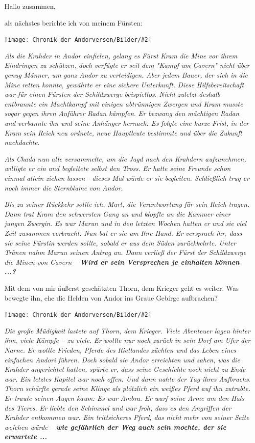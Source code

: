 \documentclass[10pt, a4paper, oneside]{book}
\newcommand{\bildmitts}[2][height=0.32\textwidth,width=0.48\textwidth,keepaspectratio]{%
    \begin{center}
        \texttt{[image: Chronik der Andorversen/Bilder/\#2]}
    \end{center}
}
\begin{document}
\begin{multicols}{2}
Hallo zusammen,

als nächstes berichte ich von meinem Fürsten:

\bildmitts{Andor III Kram.jpeg}

\textit{Als die Krahder in Andor einfielen, gelang es Fürst Kram die Mine vor ihrem Eindringen zu schützen, doch verfügte er seit dem "Kampf um Cavern" nicht über genug Männer, um ganz Andor zu verteidigen. Aber jedem Bauer, der sich in die Mine retten konnte, gewährte er eine sichere Unterkunft. Diese Hilfsbereitschaft war für einen Fürsten der Schildzwerge beispiellos. Nicht zuletzt deshalb entbrannte ein Machtkampf mit einigen abtrünnigen Zwergen und Kram musste sogar gegen ihren Anführer Radan kämpfen. Er bezwang den mächtigen Radan und verbannte ihn und seine Anhänger hernach. Es folgte eine kurze Frist, in der Kram sein Reich neu ordnete, neue Hauptleute bestimmte und über die Zukunft nachdachte.}

\textit{Als Chada nun alle versammelte, um die Jagd nach den Krahdern aufzunehmen, willigte er ein und begleitete selbst den Tross. Er hatte seine Freunde schon einmal allein ziehen lassen - dieses Mal würde er sie begleiten. Schließlich trug er noch immer die Sternblume von Andor.}

\textit{Bis zu seiner Rückkehr sollte ich, Mart, die Verantwortung für sein Reich tragen. Dann trat Kram den schwersten Gang an und klopfte an die Kammer einer jungen Zwergin. Es war Marun und in den letzten Wochen hatten er und sie viel Zeit zusammen verbracht. Nun bat er sie um Ihre Hand. Er versprach ihr, dass sie seine Fürstin werden sollte, sobald er aus dem Süden zurückkehrte. Unter Tränen nahm Marun seinen Antrag an. Dann verließ der Fürst der Schildzwerge die Minen von Cavern – \textbf{Wird er sein Versprechen je einhalten können ...?}}\bigskip

Mit dem von mir äußerst geschätzten Thorn, dem Krieger geht es weiter. Was bewegte ihn, ehe die Helden von Andor ins Graue Gebirge aufbrachen?

\bildmitts{Andor III Thorn.jpeg}

\textit{Die große Müdigkeit lastete auf Thorn, dem Krieger. Viele Abenteuer lagen hinter ihm, viele Kämpfe – zu viele. Er wollte nur noch zurück in sein Dorf am Ufer der Narne. Er wollte Frieden, Pferde des Rietlandes züchten und das Leben eines einfachen Andori führen. Doch sobald sie Andor erreichten und sahen, was die Krahder angerichtet hatten, spürte er, dass seine Geschichte noch nicht zu Ende war. Ein letztes Kapitel war noch offen. Und dann nahte der Tag ihres Aufbruchs. Thorn schärfte gerade seine Klinge als plötzlich ein weißes Pferd auf ihn zutrabte. Er traute seinen Augen kaum: Es war Ambra. Er warf seine Arme um den Hals des Tieres. Er liebte den Schimmel und war froh, dass es den Angriffen der Krahder entkommen war. Ein trittsicheres Pferd, das nicht mehr von seiner Seite weichen würde – \textbf{wie gefährlich der Weg auch sein mochte, der sie erwartete ...}}



\end{multicols}
\end{document}
